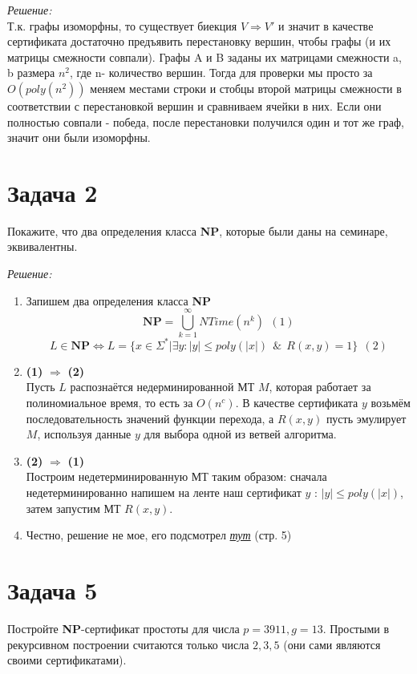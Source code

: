 \documentclass[12pt]{article}
\begin{document}
{\itshape Решение:}
\\
Т.к. графы изоморфны, то существует биекция $V\Rightarrow V'$ и значит в качестве сертификата достаточно предъявить перестановку вершин, чтобы графы (и их матрицы смежности совпали). Графы A и B заданы их матрицами смежности a, b размера $n^2$, где n- количество вершин. Тогда для проверки мы просто за $O(poly(n^2))$ меняем местами строки и стобцы второй матрицы смежности в соответствии с перестановкой вершин и сравниваем ячейки в них. Если они полностью совпали - победа, после перестановки получился один и тот же граф, значит они были изоморфны.
\section*{Задача 2}
Покажите, что два определения класса \textbf{NP}, которые были даны на семинаре, эквивалентны.

{\itshape Решение:}
\\
\begin{enumerate}
	\item Запишем два определения класса \textbf{NP}
	\[\textbf{NP} = \bigcup_{k=1}^{\infty} NTime (n^k) \ \ (1)\]
	\[L \in \textbf{NP} \Leftrightarrow L = \{x \in \Sigma^* | \exists y: |y| \le poly (|x|) \ \ \& \ \ R(x,y) = 1\} \ \ (2)\]
	\item \textbf{(1)} $\Rightarrow$ \textbf{(2)}
	\\
	Пусть $L$ распознаётся недерминированной МТ $M$, которая работает за полиномиальное время, то есть за $O(n^c)$. В качестве сертификата $y$ возьмём последовательность значений функции перехода, а $R(x,y)$ пусть эмулирует $M$, используя данные $y$ для выбора одной из ветвей алгоритма.
	\item \textbf{(2)} $\Rightarrow$ \textbf{(1)}
	\\
	Построим недетерминированную МТ таким образом: сначала недетерминированно напишем на ленте наш сертификат $y$ : $|y| \le poly (|x|)$, затем запустим МТ $R(x,y)$.
	\item Честно, решение не мое, его подсмотрел {\href{http://ru.discrete-mathematics.org/fall2014/3/complexity/lecture-2-p-np.pdf}{{\itshape тут}}} (стр. 5)
\end{enumerate}
\newpage
\section* {Задача 5}
Постройте \textbf{NP}-сертификат простоты для числа $p = 3911, g = 13$. Простыми в рекурсивном построении считаются только числа $2,3,5$ (они сами являются своими сертификатами).
\end{document}
